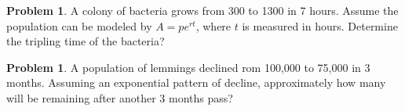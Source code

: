 \documentclass[12pt]{scrartcl}
\theoremstyle{definition}
\newtheorem{problem}[theorem]{Problem}
\begin{document}
\newpage

\begin{problem}
	A colony of bacteria grows from 300 to 1300 in 7 hours. Assume the population can be modeled by $A=pe^{rt}$, where $t$ is measured in hours. Determine the tripling time of the bacteria?
\end{problem}

\newpage

\begin{problem}
	A population of lemmings declined rom 100,000 to 75,000 in 3 months. Assuming an exponential pattern of decline, approximately how many will be remaining after another 3 months pass?
\end{problem}
\end{document}
